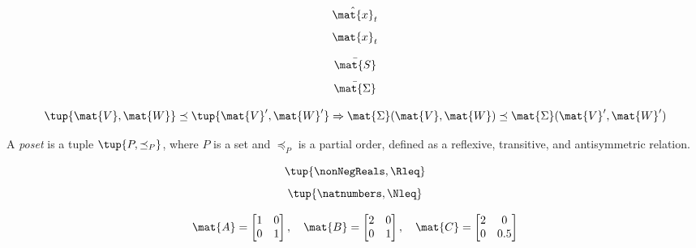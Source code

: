 {\begin{forslides}
        \begin{equation}
            \label{eq:x_estimate}
            \hat{\mat{x}}_t
        \end{equation}
        \begin{equation}
            \label{eq:x_real}
            \mat{x}_t
        \end{equation}

        \begin{equation}
            \label{eq:ric_1}
            \bar{\mat{S}}
        \end{equation}
        \begin{equation}
            \label{eq:ric_2}
            \bar{\mat{\Sigma}}
        \end{equation}

        \begin{equation}
            \label{eq:mon_est}
            \tup{\mat{V},\mat{W}}\preceq \tup{\mat{V}',\mat{W}'} \Rightarrow \mat{\Sigma}(\mat{V},\mat{W})\preceq \mat{\Sigma}(\mat{V}',\mat{W}')
        \end{equation}

        \begin{definition}
            \label{def:poset_cont}
            A \emph{poset} is a tuple $\tup{P,\preceq_P}$, where $P$ is a set and $\preceq_P$ is a partial order, defined as a reflexive, transitive, and antisymmetric relation.
        \end{definition}

        \begin{equation}
            \label{eq:posreals}
            \tup{\nonNegReals,\Rleq}
        \end{equation}
        \begin{equation}
            \label{eq:nats}
            \tup{\natnumbers,\Nleq}
        \end{equation}

        \begin{equation}
            \label{eq:matrix_poset}
            \mat{A}=\begin{bmatrix}
                1 & 0 \\0& 1
            \end{bmatrix}, \quad \mat{B}=\begin{bmatrix}
                2 & 0 \\0& 1
            \end{bmatrix},\quad \mat{C}=\begin{bmatrix}
                2 & 0 \\0& 0.5
            \end{bmatrix}
        \end{equation}


\end{forslides}}
